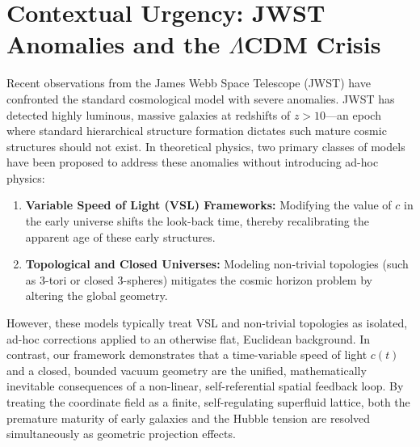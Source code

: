 \documentclass[11pt,a4paper]{article}
\theoremstyle{plain}
\theoremstyle{definition}
\theoremstyle{remark}
\begin{document}
\section{Contextual Urgency: JWST Anomalies and the $\Lambda$CDM Crisis}
Recent observations from the James Webb Space Telescope (JWST) have confronted the standard cosmological model with severe anomalies. JWST has detected highly luminous, massive galaxies at redshifts of $z > 10$—an epoch where standard hierarchical structure formation dictates such mature cosmic structures should not exist. In theoretical physics, two primary classes of models have been proposed to address these anomalies without introducing ad-hoc physics:
\begin{enumerate}
    \item \textbf{Variable Speed of Light (VSL) Frameworks:} Modifying the value of $c$ in the early universe shifts the look-back time, thereby recalibrating the apparent age of these early structures.
    \item \textbf{Topological and Closed Universes:} Modeling non-trivial topologies (such as 3-tori or closed 3-spheres) mitigates the cosmic horizon problem by altering the global geometry.
\end{enumerate}
However, these models typically treat VSL and non-trivial topologies as isolated, ad-hoc corrections applied to an otherwise flat, Euclidean background. In contrast, our framework demonstrates that a time-variable speed of light $c(t)$ and a closed, bounded vacuum geometry are the unified, mathematically inevitable consequences of a non-linear, self-referential spatial feedback loop. By treating the coordinate field as a finite, self-regulating superfluid lattice, both the premature maturity of early galaxies and the Hubble tension are resolved simultaneously as geometric projection effects.

\newpage
\end{document}
